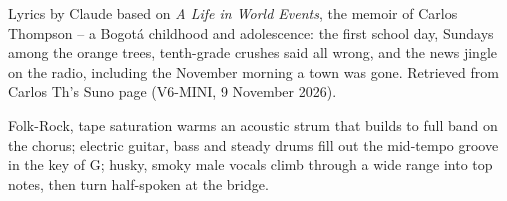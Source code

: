 
\label{sec:static-on-the-radio}
\begin{notes}
Lyrics by Claude based on \emph{A Life in World Events}, the memoir of Carlos Thompson -- a Bogotá childhood and adolescence: the first school day, Sundays among the orange trees, tenth-grade crushes said all wrong, and the news jingle on the radio, including the November morning a town was gone. Retrieved from Carlos Th's Suno page (V6-MINI, 9 November 2026).
\end{notes}
\begin{style}
Folk-Rock, tape saturation warms an acoustic strum that builds to full band on the chorus; electric guitar, bass and steady drums fill out the mid-tempo groove in the key of G; husky, smoky male vocals climb through a wide range into top notes, then turn half-spoken at the bridge.
\end{style}
